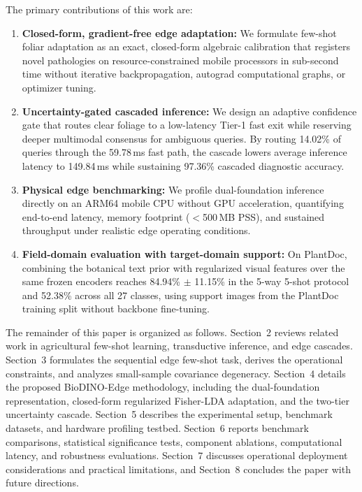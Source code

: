 \documentclass[preprint,12pt]{elsarticle}
\begin{document}
The primary contributions of this work are:
\begin{enumerate}
    \item \textbf{Closed-form, gradient-free edge adaptation:} We formulate few-shot foliar adaptation as an exact, closed-form algebraic calibration that registers novel pathologies on resource-constrained mobile processors in sub-second time without iterative backpropagation, autograd computational graphs, or optimizer tuning.
    \item \textbf{Uncertainty-gated cascaded inference:} We design an adaptive confidence gate that routes clear foliage to a low-latency Tier-1 fast exit while reserving deeper multimodal consensus for ambiguous queries. By routing 14.02\% of queries through the 59.78\,ms fast path, the cascade lowers average inference latency to 149.84\,ms while sustaining 97.36\% cascaded diagnostic accuracy.
    \item \textbf{Physical edge benchmarking:} We profile dual-foundation inference directly on an ARM64 mobile CPU without GPU acceleration, quantifying end-to-end latency, memory footprint ($<$500\,MB PSS), and sustained throughput under realistic edge operating conditions.
    \item \textbf{Field-domain evaluation with target-domain support:} On PlantDoc, combining the botanical text prior with regularized visual features over the same frozen encoders reaches 84.94\% $\pm$ 11.15\% in the 5-way 5-shot protocol and 52.38\% across all 27 classes, using support images from the PlantDoc training split without backbone fine-tuning.
\end{enumerate}

The remainder of this paper is organized as follows. Section~2 reviews related work in agricultural few-shot learning, transductive inference, and edge cascades. Section~3 formulates the sequential edge few-shot task, derives the operational constraints, and analyzes small-sample covariance degeneracy. Section~4 details the proposed BioDINO-Edge methodology, including the dual-foundation representation, closed-form regularized Fisher-LDA adaptation, and the two-tier uncertainty cascade. Section~5 describes the experimental setup, benchmark datasets, and hardware profiling testbed. Section~6 reports benchmark comparisons, statistical significance tests, component ablations, computational latency, and robustness evaluations. Section~7 discusses operational deployment considerations and practical limitations, and Section~8 concludes the paper with future directions.
\end{document}

